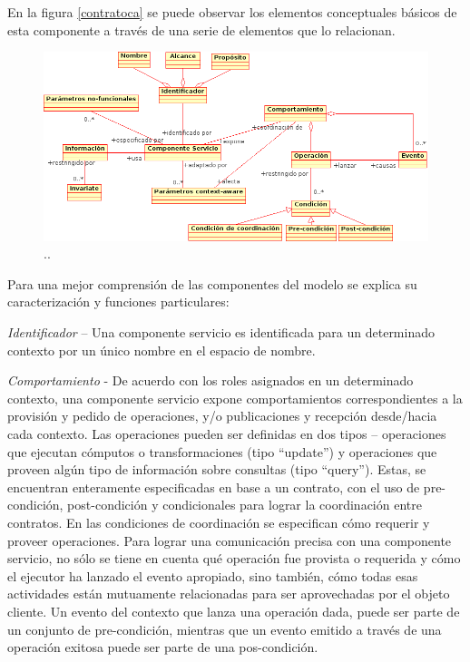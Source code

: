 En la figura \ref{contratoca} se puede observar los elementos conceptuales
básicos de esta componente a través de una serie de elementos que lo relacionan.

\begin{figure}[!h]
\begin{center}
		
		\begin{center}
 \includegraphics[width=6 in,totalheight=2.4 in]{Ch7/contratoca}
  \caption{..}\label{}
\end{center}
\end{center}
\end{figure}
 
 


Para una mejor comprensión de las componentes del modelo se explica su
caracterización y funciones particulares: 

\textit{Identificador} – Una componente servicio es identificada para un
determinado contexto por un único nombre en el espacio de nombre.

\textit{Comportamiento} -  De acuerdo con los roles asignados en un determinado
contexto, una componente servicio expone comportamientos correspondientes a la
provisión y pedido de operaciones, y/o publicaciones y recepción  desde/hacia
cada contexto. Las operaciones pueden ser definidas en dos tipos – operaciones
que ejecutan cómputos o transformaciones (tipo “update”) y operaciones que
proveen algún tipo de información sobre consultas  (tipo “query”). Estas, se
encuentran enteramente especificadas en base a  un contrato, con el uso de
pre-condición, post-condición y condicionales para lograr la coordinación entre
contratos. En las condiciones de coordinación se especifican cómo requerir y
proveer operaciones. Para lograr una comunicación precisa con una componente
servicio, no sólo se tiene en cuenta qué operación fue provista o requerida y
cómo el ejecutor ha lanzado el evento apropiado, sino también, cómo todas esas
actividades están mutuamente relacionadas para ser aprovechadas por el objeto
cliente. Un evento del contexto que lanza una operación dada, puede ser parte de
un conjunto de pre-condición, mientras que un evento emitido a través de una
operación exitosa puede ser parte de una pos-condición. 

